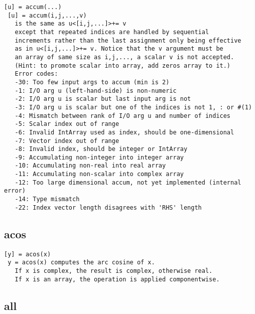 \documentclass[a4paper]{article}
\begin{document}
\begin{tscreen}
\begin{verbatim}
[u] = accum(...)
 [u] = accum(i,j,...,v)
   is the same as u<[i,j,...]>+= v
   except that repeated indices are handled by sequential
   increments rather than the last assignment only being effective
   as in u<[i,j,...]>+= v. Notice that the v argument must be
   an array of same size as i,j,..., a scalar v is not accepted.
   (Hint: to promote scalar into array, add zeros array to it.)
   Error codes:
   -30: Too few input args to accum (min is 2)
   -1: I/O arg u (left-hand-side) is non-numeric
   -2: I/O arg u is scalar but last input arg is not
   -3: I/O arg u is scalar but one of the indices is not 1, : or #(1)
   -4: Mismatch between rank of I/O arg u and number of indices
   -5: Scalar index out of range
   -6: Invalid IntArray used as index, should be one-dimensional
   -7: Vector index out of range
   -8: Invalid index, should be integer or IntArray
   -9: Accumulating non-integer into integer array
   -10: Accumulating non-real into real array
   -11: Accumulating non-scalar into complex array
   -12: Too large dimensional accum, not yet implemented (internal error)
   -14: Type mismatch
   -22: Index vector length disagrees with 'RHS' length
\end{verbatim}
\end{tscreen}





\subsection{acos\label{acos}}

\begin{tscreen}
\begin{verbatim}
[y] = acos(x)
 y = acos(x) computes the arc cosine of x.
   If x is complex, the result is complex, otherwise real.
   If x is an array, the operation is applied componentwise.
\end{verbatim}
\end{tscreen}





\subsection{all\label{all}}
\end{document}
